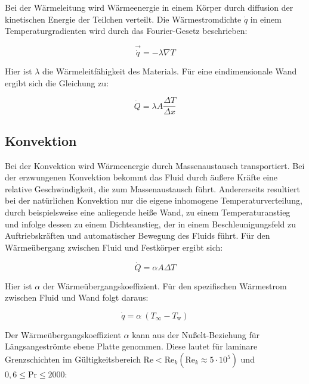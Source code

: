 Bei der Wärmeleitung wird Wärmeenergie in einem Körper durch diffusion der kinetischen Energie der Teilchen verteilt.
Die Wärmestromdichte $\dot{q}$ in einem Temperaturgradienten wird durch das Fourier-Gesetz beschrieben:

\begin{equation}
  \label{eq:fourier}
  \vec{\dot{q}} = -\lambda \nabla T
\end{equation}

Hier ist $\lambda$ die Wärmeleitfähigkeit des Materials.
Für eine eindimensionale Wand ergibt sich die Gleichung zu:

\begin{equation}
  \label{eq:fourier_1d}
  \dot{Q} = \lambda A \frac{\Delta T}{\Delta x}
\end{equation}

\subsection{Konvektion}\label{sec:konvektion}

Bei der Konvektion wird Wärmeenergie durch Massenaustausch transportiert. Bei der erzwungenen Konvektion bekommt das Fluid durch äußere Kräfte
eine relative Geschwindigkeit, die zum Massenaustausch führt. Andererseits resultiert bei der natürlichen Konvektion nur die eigene
inhomogene Temperaturverteilung, durch beispielsweise eine anliegende heiße Wand, zu einem Temperaturanstieg und infolge dessen zu einem
Dichteanstieg, der in einem Beschleunigungsfeld zu Auftriebskräften und automatischer Bewegung des Fluids führt.
Für den Wärmeübergang zwischen Fluid und Festkörper ergibt sich:

\begin{equation}
    \dot{Q}=\alpha A \Delta T 
\end{equation}

Hier ist $\alpha$ der Wärmeübergangskoeffizient.
Für den spezifischen Wärmestrom zwischen Fluid und Wand folgt daraus:

\begin{equation}
  \label{eq:qdot_freestream}
  \dot{q} = \alpha \ (T_{\infty} - T_\text{w})
\end{equation}

Der Wärmeübergangskoeffizient $\alpha$ kann aus der Nußelt-Beziehung für Längsangeströmte ebene Platte genommen. Diese lautet
für laminare Grenzschichten im Gültigkeitsbereich $\text{Re} < \text{Re}_k \left(\text{Re}_k \approx 5 \cdot 10^5\right)$ und $0,6 \leq \text{Pr} \leq 2000$:


